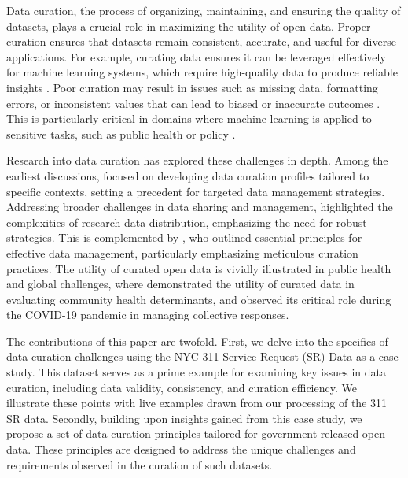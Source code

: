 \documentclass[linenumber]{jdsart}
\begin{document}
Data curation, the process of organizing, maintaining, and ensuring
the quality of datasets, plays a crucial role in maximizing the
utility of open data. Proper curation ensures that datasets remain
consistent, accurate, and useful for diverse applications. For example, 
curating data ensures it can be leveraged effectively for machine learning 
systems, which require high-quality data to produce reliable insights
\citep{polyzotis2019data, jain2020overview}. Poor 
curation may result in issues such as missing data, formatting errors, or 
inconsistent values that can lead to biased or inaccurate outcomes
\citep{geiger2020garbage}.
This is particularly critical in domains where machine learning is applied 
to sensitive tasks, such as public health or policy
\citep{rahm2000data}.


Research into data curation has explored these challenges in depth. 
Among the earliest discussions, \citet{witt2009constructing} focused 
on developing data curation profiles tailored to specific contexts, 
setting a precedent for targeted data management strategies. 
Addressing broader challenges in data sharing and management, 
\citet{borgman2012conundrum} highlighted the complexities of 
research data distribution, emphasizing the need for robust 
strategies. This is complemented by \citet{hart2016ten}, who outlined 
essential principles for effective data management, particularly 
emphasizing meticulous curation practices. The utility of curated 
open data is vividly illustrated in public health and global challenges, 
where \citet{cantor2018facets} demonstrated the utility of curated 
data in evaluating community health determinants, and 
\citet{shankar2021data} observed its critical role during the 
COVID-19 pandemic in managing collective responses.


The contributions of this paper are twofold. First, we delve into
the specifics of data curation challenges using the NYC 311 Service
Request (SR) Data as a case study. This dataset serves as a prime 
example for examining key issues in data curation, including data 
validity, consistency, and curation efficiency. 
We illustrate these points with live examples drawn from our 
processing of the 311 SR data. Secondly, building upon insights 
gained from this case study, we propose a set of data curation 
principles tailored for government-released open data. These 
principles are designed to address the unique challenges 
and requirements observed in the curation of such datasets.
\end{document}

